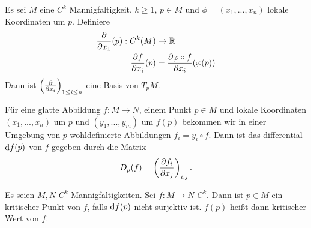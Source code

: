 \begin{remark}
    Es sei $M$ eine $C^k$ Mannigfaltigkeit, $k \geq 1$, $p \in M$ und $\phi = (x_1, ..., x_n)$
    lokale Koordinaten um $p$. Definiere
    \begin{align*} 
        \pderive{x_1}(p): C^k(M) & \to \R \\
        \pderive[f]{x_i} (p) & = \pderive[\phi \circ f]{x_i} (\phi(p))
    \end{align*}
    Dann ist $\left( \pderive{x_i} \right)_{1 \leq i \leq n}$ eine Basis von $T_pM$.

    Für eine glatte Abbildung $f \colon M \to N$, einem Punkt $p \in M$ und lokale Koordinaten 
    $(x_1, ..., x_n)$ um $p$ und $(y_1, ..., y_m)$ um $f(p)$ bekommen wir in einer Umgebung 
    von $p$ wohldefinierte Abbildungen $f_i = y_i \circ f$. Dann ist das differential 
    $\opd f (p)$ von $f$ gegeben durch die Matrix
    \[ D_p(f) = \left( \pderive[f_i]{x_j} \right)_{i,j} . \]
\end{remark}

\begin{definition}
    Es seien $M, N$ $C^k$ Mannigfaltigkeiten. Sei $f \colon M \to N$ $C^k$. Dann ist $p \in M$
    ein kritischer Punkt von $f$, falls $\opd f (p)$ nicht surjektiv ist. $f(p)$ heißt dann
    kritischer Wert von $f$.
\end{definition}